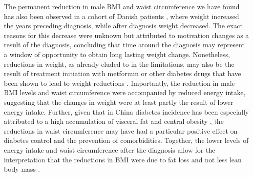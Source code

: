 The permanent reduction in male \ac{BMI} and waist circumference we have found has also been observed in a cohort of Danish patients \autocite{DeFineOlivarius2015}, where weight increased the years preceding diagnosis, while after diagnosis weight decreased. The exact reasons for this decrease were unknown but attributed to motivation changes as a result of the diagnosis, concluding that time around the diagnosis may represent a window of opportunity to obtain long lasting weight change. Nonetheless, reductions in weight, as already eluded to in the limitations, may also be the result of treatment initiation with metformin or other diabetes drugs that have been shown to lead to weight reductions \autocite{Yang2014}. Importantly, the reduction in male \ac{BMI} levels and waist circumference were accompanied by reduced energy intake, suggesting that the changes in weight were at least partly the result of lower energy intake.  Further, given that in China diabetes incidence has been especially attributed to a high accumulation of visceral fat and central obesity \autocite{Ma2014}, the reductions in waist circumference may have had a particular positive effect on diabetes control and the prevention of comorbidities. Together, the lower levels of energy intake and waist circumference after the diagnosis allow for the interpretation that the reductions in \ac{BMI} were due to fat loss and not less lean body mass \autocite{Klein2007}. 

